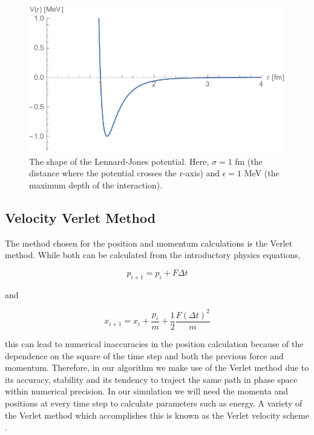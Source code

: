 \documentclass{article}
\begin{document}
\begin{multicols}{2}
\begin{figure}[H]
\begin{center}
\includegraphics[width=\linewidth]{plots/VLJ.pdf}
\caption{The shape of the Lennard-Jones potential.  Here, $\sigma=1$ fm (the distance where the potential crosses the r-axis) and $\epsilon =1$ MeV (the maximum depth of the interaction).}
\label{VLJfig}
\end{center}
\end{figure}

\subsection{Velocity Verlet Method}

The method chosen for the position and momentum calculations is the Verlet method.  While both can be calculated from the introductory physics equations,

\begin{equation}
\label{momeqn}
p_{i+1}=p_i + F \Delta t
\end{equation}

\noindent and

\begin{equation}
\label{poseqn}
x_{i+1} = x_i + \frac{p_i}{m} + \frac{1}{2}\frac{F(\Delta t)^2}{m}
\end{equation}

\noindent this can lead to numerical inaccuracies in the position calculation because of the dependence on the square of the time step and both the previous force and momentum.  Therefore, in our algorithm we make use of the Verlet method due to its accuracy, stability and its tendency to traject the same path in phase space within numerical precision.  In our simulation we will need the momenta and positions at every time step to calculate parameters such as energy.  A variety of the Verlet method which accomplishes this is known as the Verlet velocity scheme \cite{verlet}.


\end{multicols}
\end{document}
